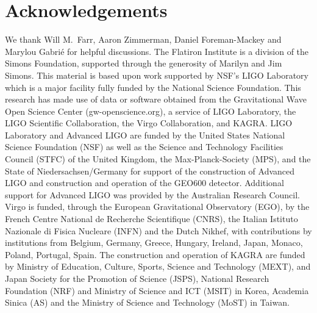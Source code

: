 \documentclass[twocolumn]{aastex631}
\begin{document}
\section{Acknowledgements}
We thank Will M.~Farr, Aaron Zimmerman, Daniel Foreman-Mackey and Marylou Gabri\'e for helpful discussions.
The Flatiron Institute is a division of the Simons Foundation, supported through the generosity of Marilyn and Jim Simons.
This material is based upon work supported by NSF's LIGO Laboratory which is a major facility fully funded by the National Science Foundation.
This research has made use of data or software obtained from the Gravitational Wave Open Science Center (gw-openscience.org), a service of LIGO Laboratory, the LIGO Scientific Collaboration, the Virgo Collaboration, and KAGRA. LIGO Laboratory and Advanced LIGO are funded by the United States National Science Foundation (NSF) as well as the Science and Technology Facilities Council (STFC) of the United Kingdom, the Max-Planck-Society (MPS), and the State of Niedersachsen/Germany for support of the construction of Advanced LIGO and construction and operation of the GEO600 detector. Additional support for Advanced LIGO was provided by the Australian Research Council. Virgo is funded, through the European Gravitational Observatory (EGO), by the French Centre National de Recherche Scientifique (CNRS), the Italian Istituto Nazionale di Fisica Nucleare (INFN) and the Dutch Nikhef, with contributions by institutions from Belgium, Germany, Greece, Hungary, Ireland, Japan, Monaco, Poland, Portugal, Spain. The construction and operation of KAGRA are funded by Ministry of Education, Culture, Sports, Science and Technology (MEXT), and Japan Society for the Promotion of Science (JSPS), National Research Foundation (NRF) and Ministry of Science and ICT (MSIT) in Korea, Academia Sinica (AS) and the Ministry of Science and Technology (MoST) in Taiwan.


\end{document}
